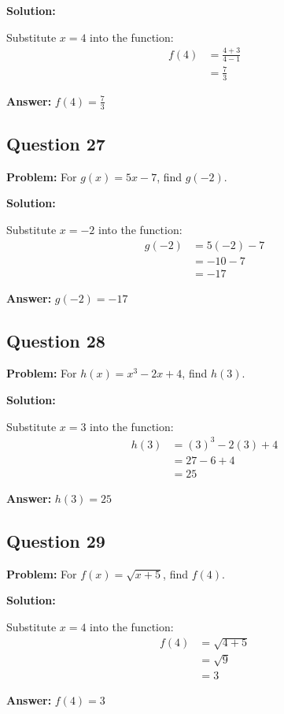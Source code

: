\documentclass[12pt]{article}
\begin{document}
\textbf{Solution:}

Substitute $x = 4$ into the function:
\begin{align*}
f(4) &= \frac{4+3}{4-1} \\
&= \frac{7}{3}
\end{align*}

\textbf{Answer:} $\boxed{f(4) = \frac{7}{3}}$

\subsection*{Question 27}
\textbf{Problem:} For $g(x) = 5x - 7$, find $g(-2)$.

\textbf{Solution:}

Substitute $x = -2$ into the function:
\begin{align*}
g(-2) &= 5(-2) - 7 \\
&= -10 - 7 \\
&= -17
\end{align*}

\textbf{Answer:} $\boxed{g(-2) = -17}$

\subsection*{Question 28}
\textbf{Problem:} For $h(x) = x^3 - 2x + 4$, find $h(3)$.

\textbf{Solution:}

Substitute $x = 3$ into the function:
\begin{align*}
h(3) &= (3)^3 - 2(3) + 4 \\
&= 27 - 6 + 4 \\
&= 25
\end{align*}

\textbf{Answer:} $\boxed{h(3) = 25}$

\subsection*{Question 29}
\textbf{Problem:} For $f(x) = \sqrt{x + 5}$, find $f(4)$.

\textbf{Solution:}

Substitute $x = 4$ into the function:
\begin{align*}
f(4) &= \sqrt{4 + 5} \\
&= \sqrt{9} \\
&= 3
\end{align*}

\textbf{Answer:} $\boxed{f(4) = 3}$
\end{document}
